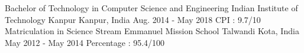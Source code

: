 \vspace{1mm}
\begin{cventries}
  \educationentry
    {Bachelor of Technology in Computer Science and Engineering}
    {Indian Institute of Technology Kanpur}
    {Kanpur, India}
    {Aug. 2014 - May 2018}
    {CPI : 9.7/10}
  \educationentry
		{Matriculation in Science Stream}
		{Emmanuel Mission School Talwandi}
		{Kota, India}
		{May 2012 - May 2014}
    {Percentage : 95.4/100}

\end{cventries}
